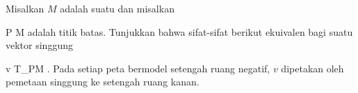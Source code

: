 {

Misalkan $M$ adalah suatu
dan misalkan

\mavergleichskette
{\vergleichskette
{ P
}
{ \in }{ \partial M
}
{  }{
}
{    }{
}
{   }{
}
}
{}{}{}
adalah titik batas. Tunjukkan bahwa sifat-sifat berikut ekuivalen bagi suatu vektor singgung

\mavergleichskette
{\vergleichskette
{ v
}
{ \in }{ T_PM
}
{  }{
}
{    }{
}
{   }{
}
}
{}{}{.}
 { Pada setiap peta bermodel setengah ruang negatif, $v$ dipetakan oleh pemetaan singgung ke setengah ruang kanan.
}

}
